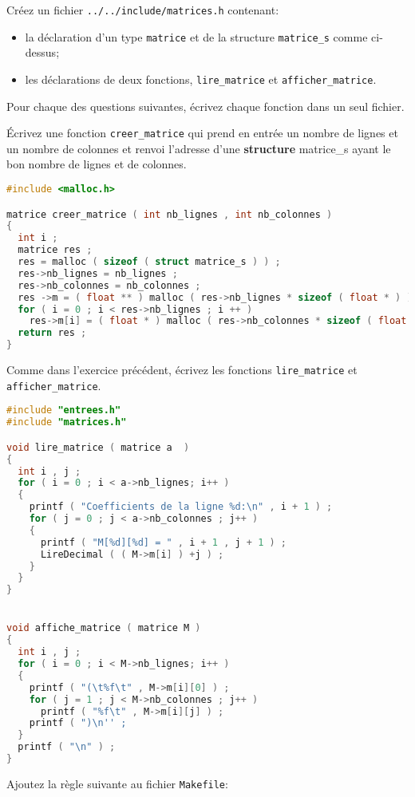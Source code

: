 \question Créez un fichier \texttt{../../include/matrices.h} contenant:
\begin{itemize}
\item la déclaration d'un type \texttt{matrice} et de la structure
  \texttt{matrice\_s} comme ci-dessus;
\item les déclarations de deux fonctions, \texttt{lire\_matrice} et
  \texttt{afficher\_matrice}.
\end{itemize}

\vspace*{1em}
Pour chaque des questions suivantes, écrivez chaque fonction dans un seul fichier.


\question Écrivez une fonction \texttt{creer\_matrice} qui prend en
entrée un nombre de lignes et un nombre de colonnes et renvoi
l'adresse d'une \textbf{structure} matrice\_s ayant le bon nombre de
lignes et de colonnes.


\begin{solutioncachee}
  \begin{lstlisting}[language=C]
#include <malloc.h>

matrice creer_matrice ( int nb_lignes , int nb_colonnes )
{
  int i ;
  matrice res ;
  res = malloc ( sizeof ( struct matrice_s ) ) ;
  res->nb_lignes = nb_lignes ;
  res->nb_colonnes = nb_colonnes ;
  res ->m = ( float ** ) malloc ( res->nb_lignes * sizeof ( float * ) ) ;
  for ( i = 0 ; i < res->nb_lignes ; i ++ )
    res->m[i] = ( float * ) malloc ( res->nb_colonnes * sizeof ( float ) ) ;
  return res ;
}
  \end{lstlisting}
\end{solutioncachee}

\question Comme dans l'exercice précédent, écrivez les fonctions \texttt{lire\_matrice} et
  \texttt{afficher\_matrice}.

\begin{solutioncachee}
  \begin{lstlisting}[language=C]
#include "entrees.h"
#include "matrices.h"

void lire_matrice ( matrice a  )
{
  int i , j ;
  for ( i = 0 ; i < a->nb_lignes; i++ )
  {
    printf ( "Coefficients de la ligne %d:\n" , i + 1 ) ;
    for ( j = 0 ; j < a->nb_colonnes ; j++ )
    {
      printf ( "M[%d][%d] = " , i + 1 , j + 1 ) ;
      LireDecimal ( ( M->m[i] ) +j ) ;
    }
  }
}


void affiche_matrice ( matrice M )
{
  int i , j ;
  for ( i = 0 ; i < M->nb_lignes; i++ )
  {
    printf ( "(\t%f\t" , M->m[i][0] ) ;
    for ( j = 1 ; j < M->nb_colonnes ; j++ )
      printf ( "%f\t" , M->m[i][j] ) ;
    printf ( ")\n'' ;
  }
  printf ( "\n" ) ;
}
  \end{lstlisting}
\end{solutioncachee}
\question Ajoutez la règle suivante au fichier \texttt{Makefile}:

